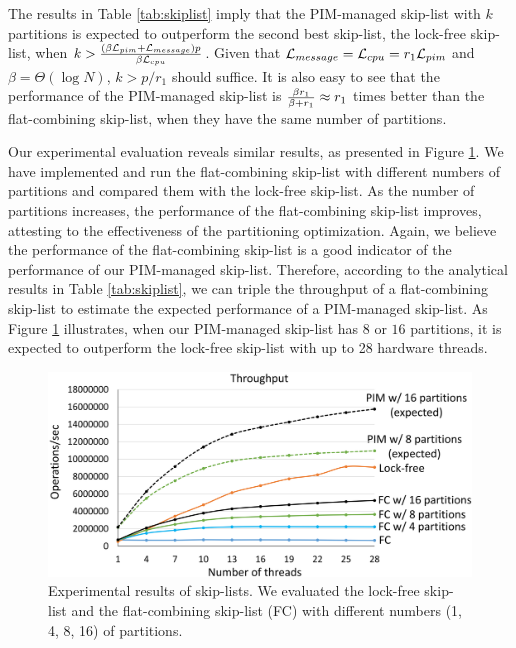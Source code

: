 The results in Table \ref{tab:skiplist} imply that 
the PIM-managed skip-list with $k$ partitions is expected to outperform the second best skip-list, 
the lock-free skip-list, when $k > {(\beta\mathcal{L}_{pim} + \mathcal{L}_{message})p \over \beta\mathcal{L}_{cpu}}$.
Given that $\mathcal{L}_{message} = \mathcal{L}_{cpu} = r_1\mathcal{L}_{pim}$ and $\beta = \Theta(\log N)$, $k > p/r_1$ should suffice.
It is also easy to see that the performance of the PIM-managed skip-list is  
${\beta r_1 \over \beta + r_1} \approx r_1$ times better than the flat-combining skip-list, 
when they have the same number of partitions. 

Our experimental evaluation reveals similar results, 
as presented in Figure \ref{figure:skiplist_data}.
We have implemented and run the flat-combining skip-list with different numbers of
partitions and compared them with the lock-free skip-list.
As the number of partitions increases, the performance of the flat-combining skip-list
improves, attesting to the effectiveness of the partitioning optimization.
Again, we believe the performance of the flat-combining skip-list is a good indicator
of the performance of our PIM-managed skip-list.
Therefore, according to the analytical results in Table \ref{tab:skiplist}, we can triple the throughput 
of a flat-combining skip-list to estimate the expected performance of a PIM-managed skip-list.
As Figure \ref{figure:skiplist_data} illustrates, when our PIM-managed skip-list has $8$ or $16$ 
partitions, it is expected to outperform the lock-free skip-list with up to 28 hardware threads.

\begin{figure}[ht!]
    \centering
    \includegraphics[width=1.0\linewidth]{skiplist_data.eps} %
    \caption{Experimental results of skip-lists. We evaluated the lock-free skip-list and 
    the flat-combining skip-list (FC) with different numbers (1, 4, 8, 16) of partitions.}
    \label{figure:skiplist_data}
\end{figure}


